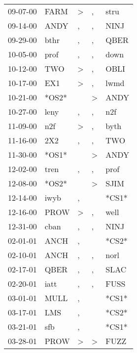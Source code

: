 \begin{supertabular}{lllll}
 09-07-00 &   FARM &     \textgreater &                , &   stru \\
 09-14-00 &   ANDY &                , &                , &   NINJ \\
 09-29-00 &   bthr &                , &                , &   QBER \\
 10-05-00 &   prof &                , &                , &   down \\
 10-12-00 &    TWO &     \textgreater &                , &   OBLI \\
 10-17-00 &    EX1 &     \textgreater &                , &   lwmd \\
 10-21-00 &  *OS2* &                  &     \textgreater &   ANDY \\
 10-27-00 &   leny &                , &                , &    n2f \\
 11-09-00 &    n2f &     \textgreater &                , &   byth \\
 11-16-00 &    2X2 &                , &                , &    TWO \\
 11-30-00 &  *OS1* &                  &     \textgreater &   ANDY \\
 12-02-00 &   tren &                , &                , &   prof \\
 12-08-00 &  *OS2* &                  &     \textgreater &   SJIM \\
 12-14-00 &   iwyb &                , &                  &  *CS1* \\
 12-16-00 &   PROW &     \textgreater &                , &   well \\
 12-31-00 &   cban &                , &                , &   NINJ \\
 02-01-01 &   ANCH &                , &                  &  *CS2* \\
 02-10-01 &   ANCH &                , &                , &   norl \\
 02-17-01 &   QBER &                , &                , &   SLAC \\
 02-20-01 &   iatt &                , &                , &   FUSS \\
 03-01-01 &   MULL &                , &                  &  *CS1* \\
 03-17-01 &    LMS &                , &                  &  *CS2* \\
 03-21-01 &    sfb &                , &                  &  *CS1* \\
 03-28-01 &   PROW &     \textgreater &     \textgreater &   FUZZ \\

\end{supertabular}
